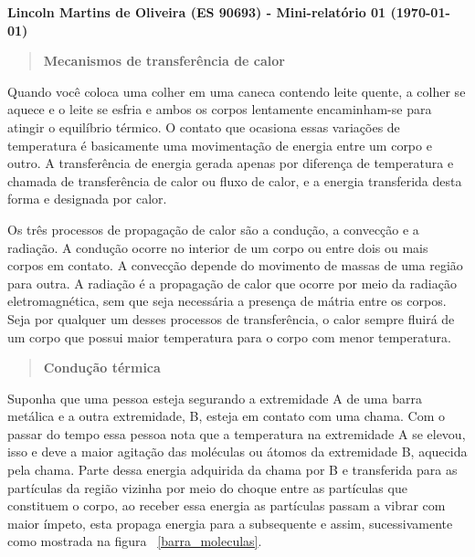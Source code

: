 \documentclass[a4wide]{report}
\begin{document}
\noindent
{\bf Lincoln Martins de Oliveira (ES 90693) - Mini-relatório 01 (\today)}

\begin{quote}

\centering

\bf Mecanismos de transfer\^encia de calor

\end{quote}


\vspace{0.5cm}

	Quando você coloca uma colher em uma caneca contendo leite quente, a colher se aquece e o leite 
se esfria e ambos os corpos lentamente encaminham-se para atingir o equilíbrio térmico. O contato 
que ocasiona essas variações de temperatura é basicamente uma movimentação de energia entre um 
corpo e outro. A transferência de energia gerada apenas por diferença de temperatura e chamada de 
transferência de calor ou fluxo de calor, e a energia transferida desta forma e designada por calor.
	
	Os três processos de propagação de calor são a condução, a convecção e a radiação.
A condução ocorre no interior de um corpo ou entre dois ou mais corpos em contato. A convecção 
depende do movimento de massas de uma região para outra. A radiação é a propagação de calor que 
ocorre por meio da radiação eletromagnética, sem que seja necessária a presença de mátria entre 
os corpos. Seja por qualquer um desses processos de transferência, o calor sempre fluirá de um 
corpo que possui maior temperatura para o corpo com menor temperatura.



\begin{quote}

\centering

\bf Condução térmica

\end{quote}

	Suponha que uma pessoa esteja segurando a extremidade A de uma barra metálica e a outra 
extremidade, B, esteja em contato com uma chama. Com o passar do tempo essa pessoa nota que a
temperatura na extremidade A se elevou, isso e deve a maior agitação das moléculas ou átomos da 
extremidade B, aquecida pela chama. Parte dessa energia adquirida da chama por B e transferida 
para as partículas da região vizinha por meio do choque entre as partículas que constituem o 
corpo, ao receber essa energia as partículas passam a vibrar com maior ímpeto, esta propaga 
energia para a subsequente e assim, sucessivamente como mostrada na figura ~\ref{barra_moleculas}.
\end{document}
